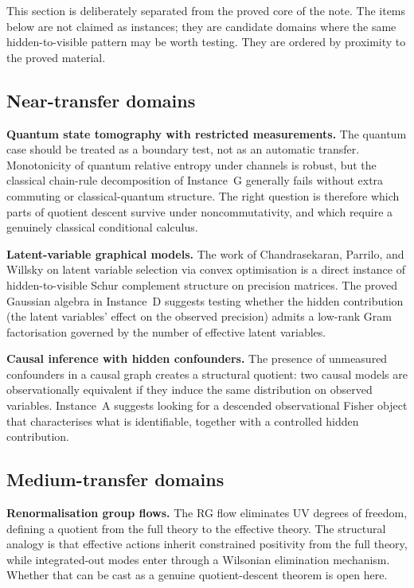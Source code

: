 \documentclass[11pt,a4paper]{article}
\numberwithin{equation}{section}
\theoremstyle{thmcompact}
\theoremstyle{remark}
\begin{document}
This section is deliberately separated from the proved core of the note. The items below are not claimed as instances; they are candidate domains where the same hidden-to-visible pattern may be worth testing. They are ordered by proximity to the proved material.

\subsection{Near-transfer domains}

\textbf{Quantum state tomography with restricted measurements.} The quantum case should be treated as a boundary test, not as an automatic transfer. Monotonicity of quantum relative entropy under channels is robust, but the classical chain-rule decomposition of Instance~G generally fails without extra commuting or classical-quantum structure. The right question is therefore which parts of quotient descent survive under noncommutativity, and which require a genuinely classical conditional calculus.

\textbf{Latent-variable graphical models.} The work of Chandrasekaran, Parrilo, and Willsky on latent variable selection via convex optimisation is a direct instance of hidden-to-visible Schur complement structure on precision matrices. The proved Gaussian algebra in Instance~D suggests testing whether the hidden contribution (the latent variables' effect on the observed precision) admits a low-rank Gram factorisation governed by the number of effective latent variables.

\textbf{Causal inference with hidden confounders.} The presence of unmeasured confounders in a causal graph creates a structural quotient: two causal models are observationally equivalent if they induce the same distribution on observed variables. Instance~A suggests looking for a descended observational Fisher object that characterises what is identifiable, together with a controlled hidden contribution.

\subsection{Medium-transfer domains}

\textbf{Renormalisation group flows.} The RG flow eliminates UV degrees of freedom, defining a quotient from the full theory to the effective theory. The structural analogy is that effective actions inherit constrained positivity from the full theory, while integrated-out modes enter through a Wilsonian elimination mechanism. Whether that can be cast as a genuine quotient-descent theorem is open here.
\end{document}
